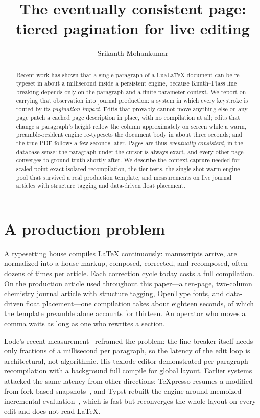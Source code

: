 \documentclass{ltugboat}
\title{The eventually consistent page:\\ tiered pagination for live
\LuaLaTeX{} editing}
\author{Srikanth Mohankumar}
\def\LuaLaTeX{Lua\LaTeX}
\begin{document}
\maketitle

\begin{abstract}
Recent work has shown that a single paragraph of a \LuaLaTeX{} document can
be re-typeset in about a millisecond inside a persistent engine, because
Knuth--Plass line breaking depends only on the paragraph and a finite
parameter context. We report on carrying that observation into journal
production: a system in which every keystroke is routed by its
\emph{pagination impact}. Edits that provably cannot move anything else on
any page patch a cached page description in place, with no compilation at
all; edits that change a paragraph's height reflow the column approximately
on screen while a warm, preamble-resident engine re-typesets the document
body in about three seconds; and the true PDF follows a few seconds later.
Pages are thus \emph{eventually consistent}, in the database sense: the
paragraph under the cursor is always exact, and every other page converges
to ground truth shortly after. We describe the context capture needed for
scaled-point-exact isolated recompilation, the tier tests, the single-shot
warm-engine pool that survived a real production template, and measurements
on live journal articles with structure tagging and data-driven float
placement.
\end{abstract}

\section{A production problem}

A typesetting house compiles \LaTeX{} continuously: manuscripts arrive,
are normalized into a house markup, composed, corrected, and recomposed,
often dozens of times per article. Each correction cycle today costs a full
compilation. On the production article used throughout this paper---a
ten-page, two-column chemistry journal article with structure tagging,
OpenType fonts, and data-driven float placement---one compilation takes
about eighteen seconds, of which the template preamble alone accounts for
thirteen. An operator who moves a comma waits as long as one who rewrites
a section.

Lode's recent measurement~\cite{lode:realtime} reframed the problem: the
line breaker itself needs only fractions of a millisecond per paragraph,
so the latency of the edit loop is architectural, not algorithmic. His
\textsf{texlode} editor demonstrated per-paragraph recompilation with a
background full compile for global layout. Earlier systems attacked the
same latency from other directions: \TeX presso resumes a modified \XeTeX{}
from fork-based snapshots~\cite{texpresso}, and Typst rebuilt the engine
around memoized incremental evaluation~\cite{haug:thesis}, which is fast
but reconverges the whole layout on every edit and does not read \LaTeX.
\end{document}
